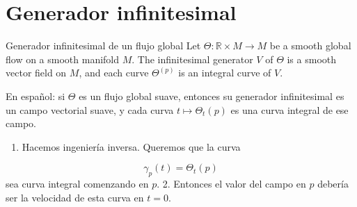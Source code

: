 \section{Generador infinitesimal}
\begin{bookproposition}{Generador infinitesimal de un flujo global}
Let $\Theta:\mathbb R\times M\to M$ be a smooth global flow on a smooth manifold $M$. The infinitesimal generator $V$ of $\Theta$ is a smooth vector field on $M$, and each curve $\Theta^{(p)}$ is an integral curve of $V$.

En español: si $\Theta$ es un flujo global suave, entonces su generador infinitesimal es un campo vectorial suave, y cada curva $t\mapsto\Theta_t(p)$ es una curva integral de ese campo.

\end{bookproposition}
\begin{bookproof}{}
\begin{enumerate}
\item Hacemos ingeniería inversa. Queremos que la curva
\end{enumerate}
\[
\gamma_p(t)=\Theta_t(p)
\]
sea curva integral comenzando en $p$. 2. Entonces el valor del campo en $p$ debería ser la velocidad de esta curva en $t=0$.


\end{bookproof}

